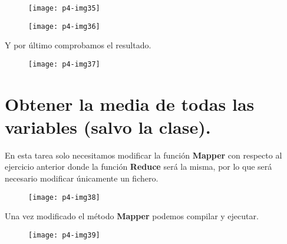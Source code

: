 \documentclass[10pt]{article}
\begin{document}
\begin{figure}[H]
	\begin{center}
 		\texttt{[image: p4-img35]}
	\end{center} 
\end{figure}

\begin{figure}[H]
	\begin{center}
 		\texttt{[image: p4-img36]}
	\end{center} 
\end{figure}

Y por último comprobamos el resultado. \\

\begin{figure}[H]
	\begin{center}
 		\texttt{[image: p4-img37]}
	\end{center} 
\end{figure}


\section{Obtener la media de todas las variables (salvo la clase).} 
En esta tarea solo necesitamos modificar la función \textbf{Mapper} con respecto al ejercicio anterior donde la función \textbf{Reduce} será la misma, por lo que será necesario modificar únicamente un fichero. \\

\begin{figure}[H]
	\begin{center}
 		\texttt{[image: p4-img38]}
	\end{center} 
\end{figure}

Una vez modificado el método \textbf{Mapper} podemos compilar y ejecutar. \\

\begin{figure}[H]
	\begin{center}
 		\texttt{[image: p4-img39]}
	\end{center} 
\end{figure}
\end{document}
